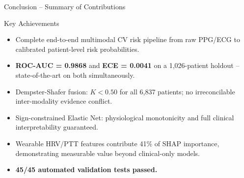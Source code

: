 \documentclass[aspectratio=169]{beamer}
\begin{document}
\begin{frame}{Conclusion -- Summary of Contributions}
  \begin{block}{Key Achievements}
    \begin{itemize}
      \item Complete end-to-end multimodal CV risk pipeline from raw PPG/ECG
            to calibrated patient-level risk probabilities.
      \item \textbf{ROC-AUC = 0.9868} and \textbf{ECE = 0.0041} on a
            1,026-patient holdout -- state-of-the-art on both simultaneously.
      \item Dempster-Shafer fusion: $K{<}0.50$ for all 6,837 patients;
            no irreconcilable inter-modality evidence conflict.
      \item Sign-constrained Elastic Net: physiological monotonicity
            and full clinical interpretability guaranteed.
      \item Wearable HRV/PTT features contribute 41\% of SHAP importance,
            demonstrating measurable value beyond clinical-only models.
      \item \textbf{45/45 automated validation tests passed.}
    \end{itemize}
  \end{block}
\end{frame}
\end{document}
